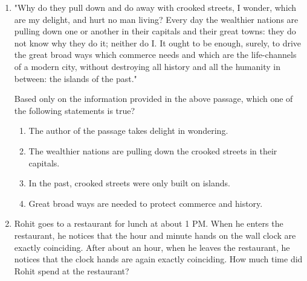 \documentclass[journal,12pt,onecolumn]{article}
\theoremstyle{remark}
\begin{document}
\begin{enumerate}
\item "Why do they pull down and do away with crooked streets, I wonder, which are my delight, and hurt no man living? Every day the wealthier nations are pulling down one or another in their capitals and their great towns: they do not know why they do it; neither do I. It ought to be enough, surely, to drive the great broad ways which commerce needs and which are the life-channels of a modern city, without destroying all history and all the humanity in between: the islands of the past." 

Based only on the information provided in the above passage, which one of the following statements is true?

\hfill{}
\begin{enumerate}
    \item The author of the passage takes delight in wondering.
    \item The wealthier nations are pulling down the crooked streets in their capitals.
    \item In the past, crooked streets were only built on islands.
    \item Great broad ways are needed to protect commerce and history.
\end{enumerate}

\item Rohit goes to a restaurant for lunch at about 1 PM. When he enters the restaurant, he notices that the hour and minute hands on the wall clock are exactly coinciding. After about an hour, when he leaves the restaurant, he notices that the clock hands are again exactly coinciding. How much time  did Rohit spend at the restaurant?

\hfill{}
\begin{enumerate}
\end{enumerate}


\end{enumerate}
\end{document}
